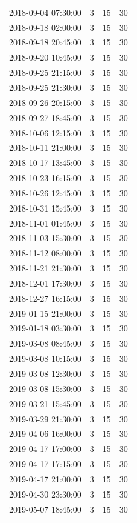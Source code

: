 \begin{tabular}{lrrr}
2018-09-04 07:30:00 & 3 & 15 & 30 \\
2018-09-18 02:00:00 & 3 & 15 & 30 \\
2018-09-18 20:45:00 & 3 & 15 & 30 \\
2018-09-20 10:45:00 & 3 & 15 & 30 \\
2018-09-25 21:15:00 & 3 & 15 & 30 \\
2018-09-25 21:30:00 & 3 & 15 & 30 \\
2018-09-26 20:15:00 & 3 & 15 & 30 \\
2018-09-27 18:45:00 & 3 & 15 & 30 \\
2018-10-06 12:15:00 & 3 & 15 & 30 \\
2018-10-11 21:00:00 & 3 & 15 & 30 \\
2018-10-17 13:45:00 & 3 & 15 & 30 \\
2018-10-23 16:15:00 & 3 & 15 & 30 \\
2018-10-26 12:45:00 & 3 & 15 & 30 \\
2018-10-31 15:45:00 & 3 & 15 & 30 \\
2018-11-01 01:45:00 & 3 & 15 & 30 \\
2018-11-03 15:30:00 & 3 & 15 & 30 \\
2018-11-12 08:00:00 & 3 & 15 & 30 \\
2018-11-21 21:30:00 & 3 & 15 & 30 \\
2018-12-01 17:30:00 & 3 & 15 & 30 \\
2018-12-27 16:15:00 & 3 & 15 & 30 \\
2019-01-15 21:00:00 & 3 & 15 & 30 \\
2019-01-18 03:30:00 & 3 & 15 & 30 \\
2019-03-08 08:45:00 & 3 & 15 & 30 \\
2019-03-08 10:15:00 & 3 & 15 & 30 \\
2019-03-08 12:30:00 & 3 & 15 & 30 \\
2019-03-08 15:30:00 & 3 & 15 & 30 \\
2019-03-21 15:45:00 & 3 & 15 & 30 \\
2019-03-29 21:30:00 & 3 & 15 & 30 \\
2019-04-06 16:00:00 & 3 & 15 & 30 \\
2019-04-17 17:00:00 & 3 & 15 & 30 \\
2019-04-17 17:15:00 & 3 & 15 & 30 \\
2019-04-17 21:00:00 & 3 & 15 & 30 \\
2019-04-30 23:30:00 & 3 & 15 & 30 \\
2019-05-07 18:45:00 & 3 & 15 & 30 \\

\end{tabular}
